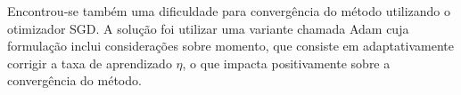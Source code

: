Encontrou-se também uma dificuldade para convergência do método utilizando o otimizador SGD. A solução foi utilizar uma variante chamada Adam cuja formulação inclui considerações sobre momento, que consiste em adaptativamente corrigir a taxa de aprendizado $\eta$, o que impacta positivamente sobre a convergência do método.

